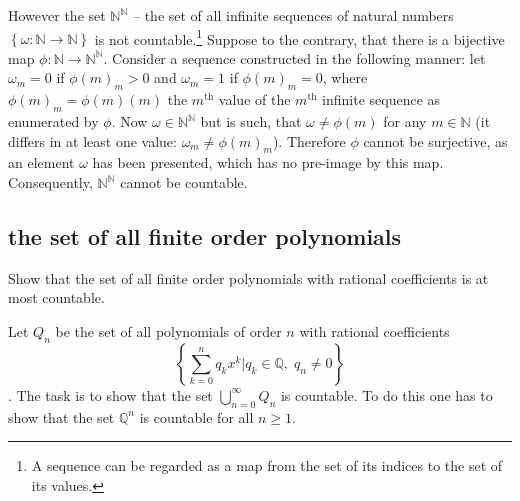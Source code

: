 \documentclass[a4paper]{article}
\newcommand{\obj}[1]{\left\{{#1}\right\}}
\begin{document}
However the set $\mathbb{N}^\mathbb{N}$ -- the set of all infinite sequences of natural numbers $\obj{\omega:\mathbb{N}\to\mathbb{N}}$ is not countable.\footnote{A sequence can be regarded as a map from the set of its indices to the set of its values.} Suppose to the contrary, that there is a bijective map $\phi:\mathbb{N}\to \mathbb{N}^\mathbb{N}$. Consider a sequence constructed in the following manner: let $\omega_m = 0$ if $\phi(m)_m>0$ and $\omega_m = 1$ if $\phi(m)_m=0$, where $\phi(m)_m = \phi(m)(m)$ the $m^\text{th}$ value of the $m^\text{th}$ infinite sequence as enumerated by $\phi$. Now $\omega\in \mathbb{N}^\mathbb{N}$ but is such, that $\omega\neq \phi(m)$ for any $m\in \mathbb{N}$ (it differs in at least one value: $\omega_m\neq \phi(m)_m$). Therefore $\phi$ cannot be surjective, as an element $\omega$ has been presented, which has no pre-image by this map. Consequently, $\mathbb{N}^\mathbb{N}$ cannot be countable.



\subsection{the set of all finite order polynomials} %
\label{sub:the_set_of_all_finite_order_polynomials}
Show that the set of all finite order polynomials with rational coefficients is at most countable.

Let $Q_n$ be the set of all polynomials of order $n$ with rational coefficients \[\obj{ \sum_{k=0}^n q_k x^k \vert q_k \in \mathbb{Q},\;q_n \neq 0 }\]. The task is to show that the set $\bigcup_{n=0}^\infty Q_n$ is countable. To do this one has to show that the set $\mathbb{Q}^n$ is countable for all $n\geq 1$.
\end{document}
